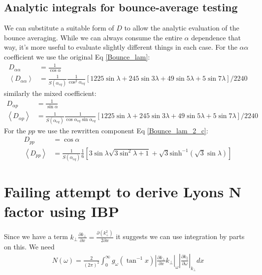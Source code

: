\documentclass[]{article}
\begin{document}
\subsection{Analytic integrals for bounce-average testing}
We can substitute a suitable form of $D$ to allow the analytic evaluation of the bounce averaging. While we can always consume the entire $\alpha$ dependence that way, it's more useful to evaluate slightly different things in each case.
For the $\alpha \alpha$ coefficient we use the original Eq \ref{Bounce_lam}:
\begin{align}
D_{\alpha\alpha} &= \frac{1}{\cos \alpha}\\
\left< D_{\alpha \alpha}\right> &= \frac{1}{S(\alpha_{eq})} \frac{1}{\cos^2 \alpha_{eq}} \left[ 1225 \sin \lambda + 245 \sin 3\lambda + 49 \sin 5\lambda + 5 \sin 7\lambda\right]/2240
\end{align}
similarly the mixed coefficient:
\begin{align}
D_{\alpha p} &= \frac{1}{\sin \alpha}\\
\left< D_{\alpha p}\right> &= \frac{1}{S(\alpha_{eq})} \frac{1}{\cos\alpha_{eq}\sin\alpha_{eq}} \left[ 1225 \sin \lambda + 245 \sin 3\lambda + 49 \sin 5\lambda + 5 \sin 7\lambda\right]/2240
\end{align}
For the $p p$ we use the rewritten component Eq \ref{Bounce_lam_2_c}:
\begin{align}
D_{p p} & = \cos \alpha\\
\left< D_{p p}\right> &= \frac{1}{S(\alpha_{eq})} \frac{1}{6} \left[ 3 \sin \lambda \sqrt{3 \sin^2 \lambda + 1} + \sqrt{3} \mathrm{sinh}^{-1}(\sqrt{3}\sin\lambda)\right]
\end{align}

\newpage
\appendix
\section{Failing attempt to derive Lyons N factor using IBP}
Since we have a term $k_\perp  \frac{\partial k_\perp}{\partial x}= \frac{\partial (k_\perp^2)}{2 \partial x}$ it suggests we can use integration by parts on this. We need
\begin{align}
N(\omega) = \frac{2}{(2\pi)^2} \int_0^\infty g_\omega( \tan^{-1} x ) \left| \frac{\partial k_\perp}{\partial x}k_\perp\right|_\omega \left| \frac{\partial k_\parallel}{\partial \omega}\right|_{k_\perp}   d x
\end{align}
\end{document}
